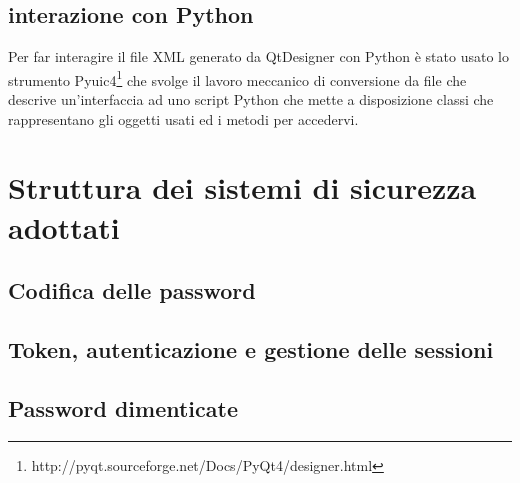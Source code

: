 \documentclass[12pt]{scrartcl}
\begin{document}
\subsection{interazione con Python}
Per far interagire il file XML generato da QtDesigner con Python
\`e stato usato lo strumento Pyuic4\footnote{http://pyqt.sourceforge.net/Docs/PyQt4/designer.html}
che svolge il lavoro meccanico di conversione da file che descrive un'interfaccia
ad uno script Python che mette a disposizione classi che rappresentano
gli oggetti usati ed i metodi  per accedervi.


\section{Struttura dei sistemi di sicurezza adottati}
\subsection{Codifica delle password}

\subsection{Token, autenticazione e gestione delle sessioni}
\subsection{Password dimenticate}
\end{document}
